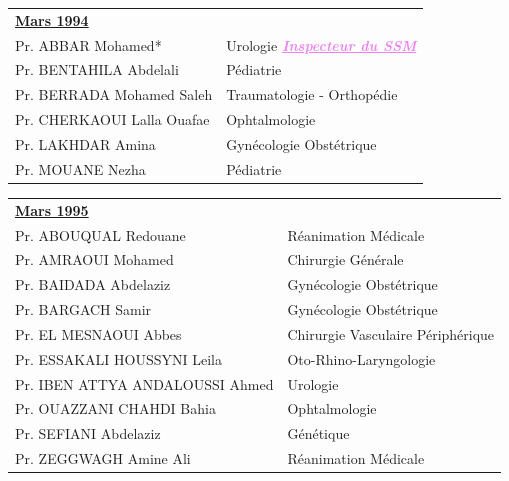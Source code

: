  \begin{tabular}{l l}
  \multicolumn{2}{l}{\textbf{\underline{Mars 1994}}}\vspace*{0.5em}\\
  Pr. ABBAR Mohamed* & \hspace*{2em} Urologie   \textcolor{violet}{\textbf{\emph{\underline{Inspecteur du SSM }}}} \\
  Pr. BENTAHILA Abdelali & \hspace*{2em} Pédiatrie \\
  Pr. BERRADA Mohamed Saleh & \hspace*{2em} Traumatologie - Orthopédie \\
  Pr. CHERKAOUI Lalla Ouafae	& \hspace*{2em} Ophtalmologie\\
  Pr. LAKHDAR Amina &	\hspace*{2em} Gynécologie Obstétrique \\
  Pr. MOUANE Nezha  & \hspace*{2em} Pédiatrie \\
 \end{tabular}

 \vspace*{1em}

\begin{tabular}{l l}
  \multicolumn{2}{l}{\textbf{\underline{Mars 1995}}}\vspace*{0.5em}\\
  Pr. ABOUQUAL Redouane	& Réanimation Médicale\\
  Pr. AMRAOUI Mohamed	& Chirurgie Générale\\
  Pr. BAIDADA Abdelaziz	&  Gynécologie Obstétrique\\
  Pr. BARGACH Samir	& Gynécologie Obstétrique\\
  Pr. EL MESNAOUI Abbes	& Chirurgie Vasculaire Périphérique\\
  Pr. ESSAKALI HOUSSYNI Leila	& Oto-Rhino-Laryngologie\\
  Pr. IBEN ATTYA ANDALOUSSI Ahmed	&  Urologie\\
  Pr. OUAZZANI CHAHDI Bahia	&  Ophtalmologie\\
  Pr. SEFIANI Abdelaziz	& Génétique\\
  Pr. ZEGGWAGH Amine Ali	& Réanimation Médicale\\
  
\end{tabular}


